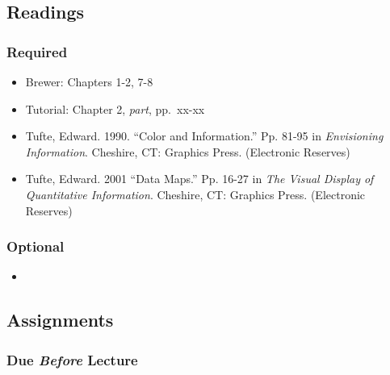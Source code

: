 \documentclass[]{book}
\begin{document}
\hypertarget{readings-4}{%
\subsection*{Readings}\label{readings-4}}

\hypertarget{required-3}{%
\subsubsection*{Required}\label{required-3}}

\begin{itemize}
\item
  Brewer: Chapters 1-2, 7-8
\item
  Tutorial: Chapter 2, \emph{part}, pp.~xx-xx
\item
  Tufte, Edward. 1990. ``Color and Information.'' Pp. 81-95 in \emph{Envisioning Information}. Cheshire, CT: Graphics Press. (Electronic Reserves)
\item
  Tufte, Edward. 2001 ``Data Maps.'' Pp. 16-27 in \emph{The Visual Display of Quantitative Information}. Cheshire, CT: Graphics Press. (Electronic Reserves)
\end{itemize}

\hypertarget{optional-2}{%
\subsubsection*{Optional}\label{optional-2}}

\begin{itemize}
\item
\end{itemize}

\hypertarget{assignments-4}{%
\subsection*{Assignments}\label{assignments-4}}

\hypertarget{due-before-lecture-2}{%
\subsubsection*{\texorpdfstring{Due \emph{Before} Lecture}{Due Before Lecture}}\label{due-before-lecture-2}}
\end{document}
